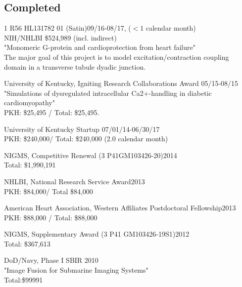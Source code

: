 
\subsection{Completed} 
\vspace{-10pt}
1	R56	HL131782	01 (Satin)\dacoi\hfill 09/16-08/17, ($<1$ calendar month)\\
NIH/NHLBI \hfill \$524,989 (incl. indirect)\\
"Monomeric G-protein and cardioprotection from heart failure"\\
The major goal of this project is to model excitation/contraction coupling domain in a transverse tubule dyadic junction. 

University of Kentucky, Igniting Research Collaborations Award \dapi \hfill 05/15-08/15 \\
"Simulations of dysregulated intracellular Ca2+-handling in diabetic cardiomyopathy"  \\
PKH: \$25,495 / Total: \$25,495.

University of Kentucky Startup \dapi \hfill 07/01/14-06/30/17 \\
PKH: \$240,000/ Total: \$240,000 (2.0 calendar month)


NIGMS, Competitive Renewal (3 P41GM103426-20)\dasig\hfill 2014 \\
Total: \$1,990,191 

NHLBI, National Research Service Award\dapi  \hfill 2013 \\  %
PKH: \$84,000/ Total \$84,000

American Heart Association, Western Affiliates Postdoctoral Fellowship\dapi \hfill 2013 \\
PKH: \$88,000 / Total: \$88,000 

NIGMS,  Supplementary Award  (3 P41 GM103426-19S1)\dasig  \hfill 2012 \\
Total: \$367,613 

\noindent DoD/Navy, Phase I SBIR \dasig \hfill 2010 \\
"Image Fusion for Submarine Imaging Systems"\\
Total:\$99991 


